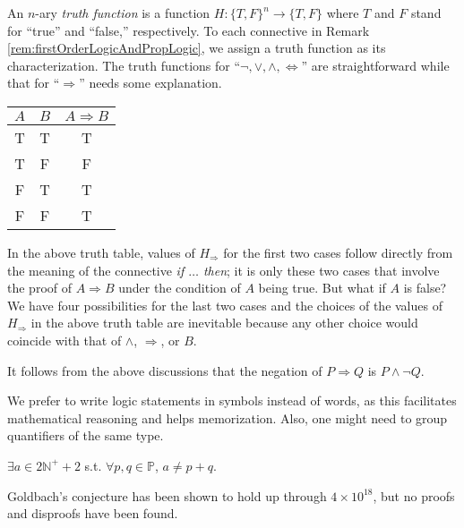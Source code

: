 \begin{rem}
  An $n$-ary \emph{truth function} is a function
  $H: \{T, F\}^n \rightarrow \{T,F\}$
  where $T$ and $F$ stand for ``true'' and ``false,'' respectively.
  To each connective in Remark \ref{rem:firstOrderLogicAndPropLogic},
  we assign a truth function as its characterization.
  The truth functions for ``$\neg, \vee, \wedge, \Leftrightarrow$''
  are straightforward while that for ``$\Rightarrow$''
  needs some explanation.
  \begin{center}
    \begin{tabular}{cc|c}
      $A$ & $B$ & $A \Rightarrow B$
      \\ \hline
      T & T & T
      \\ \hline
      T & F & F
      \\ \hline
      F & T & T
      \\ \hline
      F & F & T
      \\ \hline
    \end{tabular}
  \end{center}
  In the above truth table, 
  values of $H_{\Rightarrow}$
  for the first two cases follow directly from
  the meaning of the connective \emph{if $\ldots$ then}; 
  it is only these two cases that involve
  the proof of $A \Rightarrow B$
  under the condition of $A$ being true.
  But what if $A$ is false?
  We have four possibilities
  for the last two cases
  and the choices of the values of $H_{\Rightarrow}$
  in the above truth table
  are inevitable because any other choice
  would coincide with that of $\wedge$, $\Rightarrow$,
  or $B$.

  It follows from the above discussions that
  the negation of $P \Rightarrow Q$
  is $P \wedge \neg Q$.
\end{rem}

\begin{rem}
  We prefer to write logic statements in symbols
  instead of words, 
  as this facilitates mathematical reasoning
  and helps memorization.
  Also, one might need to group quantifiers of the same type.
\end{rem}

\begin{exm}
  $\exists a\in 2\mathbb{N}^++2$ s.t. $\forall p,q \in \mathbb{P}$, 
   $a\ne p+q$.
\end{exm}

\begin{rem}
 Goldbach's conjecture has been shown to hold up through $4\times10^{18}$,
   but no proofs and disproofs have been found.
\end{rem}

